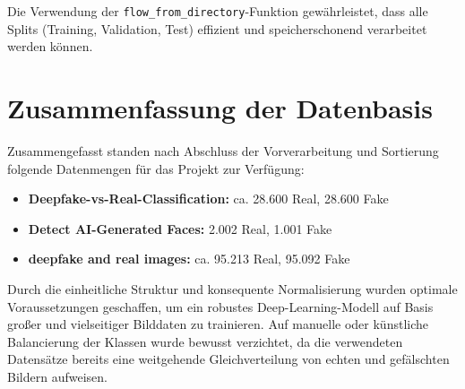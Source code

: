 Die Verwendung der \texttt{flow\_from\_directory}-Funktion gewährleistet, dass alle Splits (Training, Validation, Test) effizient und speicherschonend verarbeitet werden können.

\section{Zusammenfassung der Datenbasis}

Zusammengefasst standen nach Abschluss der Vorverarbeitung und Sortierung folgende Datenmengen für das Projekt zur Verfügung:

\begin{itemize}
    \item \textbf{Deepfake-vs-Real-Classification:} ca. 28.600 Real, 28.600 Fake
    \item \textbf{Detect AI-Generated Faces:} 2.002 Real, 1.001 Fake
    \item \textbf{deepfake and real images:} ca. 95.213 Real, 95.092 Fake
\end{itemize}

Durch die einheitliche Struktur und konsequente Normalisierung wurden optimale Voraussetzungen geschaffen, um ein robustes Deep-Learning-Modell auf Basis großer und vielseitiger Bilddaten zu trainieren. Auf manuelle oder künstliche Balancierung der Klassen wurde bewusst verzichtet, da die verwendeten Datensätze bereits eine weitgehende Gleichverteilung von echten und gefälschten Bildern aufweisen.
